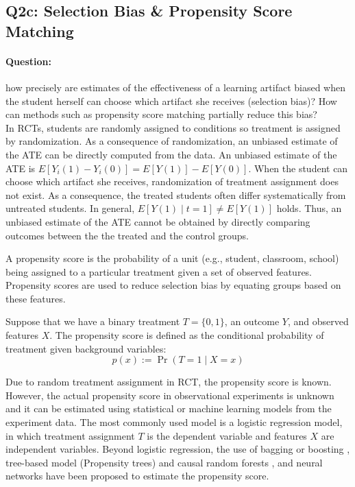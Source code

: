 \documentclass{article}
\begin{document}
\subsection{Q2c: Selection Bias \& Propensity Score Matching}

\paragraph{Question:} how precisely are estimates of the effectiveness of
a learning artifact biased when the student herself can choose which
artifact she receives (selection bias)? How can methods such as
propensity score matching partially reduce this bias? \\ [0.1 in]

In RCTs, students are randomly assigned to conditions so treatment is assigned by randomization. As a consequence of
randomization, an unbiased estimate of the ATE can be directly
computed from the data. An unbiased estimate of the ATE is
$E[Y_i(1)-Y_i(0)]=E[Y(1)] - E[Y(0)]$. When the student can choose
which artifact she receives, randomization of treatment assignment
does not exist. As a consequence, the treated students often differ
systematically from untreated students. In general, $E[Y(1)\mid t=1]
\neq E[Y(1)]$ holds. Thus, an unbiased estimate of the ATE cannot be
obtained by directly comparing outcomes between the the treated and the control groups.

A propensity score \cite{rosenbaum1983central} is the probability of a unit (e.g., student,
classroom, school) being assigned to a particular treatment given a
set of observed features. Propensity scores are used to reduce
selection bias by equating groups based on these features.

Suppose that we have a binary treatment $T=\{0,1\}$, an outcome $Y$, and
observed features $X$. The propensity score is defined as the
conditional probability of treatment given background variables:
$$p(x):= \Pr(T=1 \mid X=x)$$

Due to random treatment assignment in RCT, the propensity score is
known. However, the actual propensity score in observational experiments is
unknown and it can be estimated using statistical or machine
learning models from the experiment data. The most commonly used model
is a logistic regression model, in which treatment assignment $T$ is
the dependent variable and features $X$ are independent variables. Beyond logistic regression, the
use of bagging or boosting \cite{Lee2010-zr}, tree-based model
(Propensity trees) and causal random forests
\cite{wager2015estimation}, and neural networks
\cite{setoguchi2008evaluating} have been proposed to estimate the
propensity score.
\end{document}
